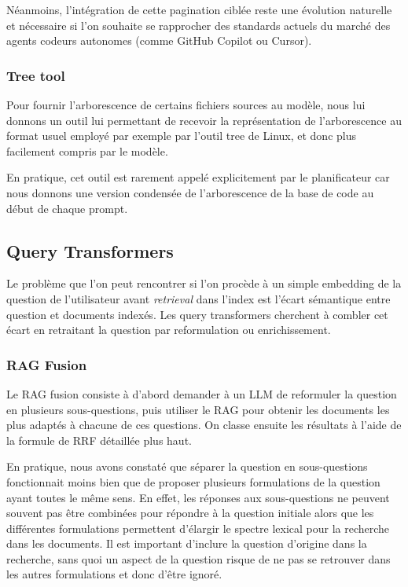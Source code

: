 Néanmoins, l'intégration de cette pagination ciblée reste une évolution naturelle et nécessaire si l'on souhaite se rapprocher des standards actuels du marché des agents codeurs autonomes (comme GitHub Copilot ou Cursor).

\subsubsection{Tree tool}
Pour fournir l'arborescence de certains fichiers sources au modèle, nous lui donnons un outil lui permettant de recevoir la représentation de l'arborescence au format usuel employé par exemple par l'outil tree de Linux, et donc plus facilement compris par le modèle.

En pratique, cet outil est rarement appelé explicitement par le planificateur car nous donnons une version condensée de l'arborescence de la base de code au début de chaque prompt.


 




\subsection{Query Transformers}

Le problème que l'on peut rencontrer si l'on procède à un simple embedding de la question de l'utilisateur avant \textit{retrieval} dans l'index est l'écart sémantique entre question et documents indexés. Les query transformers cherchent à combler cet écart en retraitant la question par reformulation ou enrichissement.

\subsubsection{RAG Fusion}
Le RAG fusion \cite{RAGFusion} consiste à d’abord demander à un LLM de reformuler la question en plusieurs sous-questions, puis utiliser le RAG pour obtenir les documents les plus adaptés à chacune de ces questions. On classe ensuite les résultats à l’aide de la formule de RRF détaillée plus haut.

En pratique, nous avons constaté que séparer la question en sous-questions fonctionnait moins bien que de proposer plusieurs formulations de la question ayant toutes le même sens. En effet, les réponses aux sous-questions ne peuvent souvent pas être combinées pour répondre à la question initiale alors que les différentes formulations permettent d'élargir le spectre lexical pour la recherche dans les documents. Il est important d'inclure la question d'origine dans la recherche, sans quoi un aspect de la question risque de ne pas se retrouver dans les autres formulations et donc d'être ignoré.


